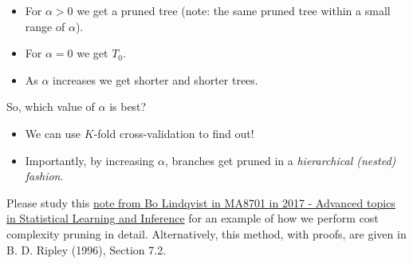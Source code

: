\documentclass[10pt,ignorenonframetext,]{beamer}
\begin{document}
\begin{frame}

\begin{itemize}
\item
  For \(\alpha>0\) we get a pruned tree (note: the same pruned tree
  within a small range of \(\alpha\)).
\item
  For \(\alpha=0\) we get \(T_0\).
\item
  As \(\alpha\) increases we get shorter and shorter trees.
\end{itemize}

So, which value of \(\alpha\) is best?

\begin{itemize}
\item
  We can use \(K\)-fold cross-validation to find out!
\item
  Importantly, by increasing \(\alpha\), branches get pruned in a
  \emph{hierarchical (nested) fashion}.
\end{itemize}

Please study this
\href{https://www.math.ntnu.no/emner/TMA4268/2018v/notes/CART1MA87012017BoLindqvist.pdf}{note
from Bo Lindqvist in MA8701 in 2017 - Advanced topics in Statistical
Learning and Inference} for an example of how we perform cost complexity
pruning in detail. Alternatively, this method, with proofs, are given in
B. D. Ripley (1996), Section 7.2.

\end{frame}
\end{document}
